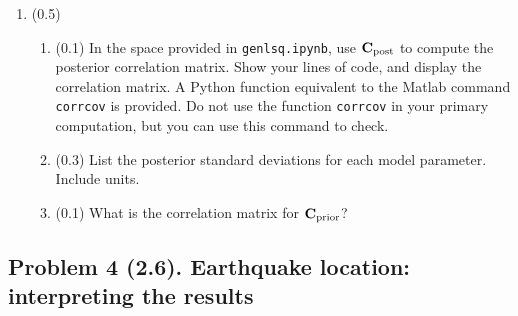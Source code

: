 \documentclass[11pt,titlepage,fleqn]{article}
\begin{document}
\begin{enumerate}
\item (0.5) 
\begin{enumerate}
\item (0.1) In the space provided in \verb+genlsq.ipynb+, use $\mbox{${\bf C}$}_{\rm post}$ to compute the posterior correlation matrix. Show your lines of code, and display the correlation matrix. A Python function equivalent to the Matlab command \verb+corrcov+ is provided. Do not use the function \verb+corrcov+ in your primary computation, but you can use this command to check.

\item (0.3) List the posterior standard deviations for each model parameter. Include units.

\item (0.1) What is the correlation matrix for $\mbox{${\bf C}$}_{\rm prior}$?
\end{enumerate}

\end{enumerate}


\pagebreak
\subsection*{Problem 4 (2.6). Earthquake location: interpreting the results}
\end{document}
